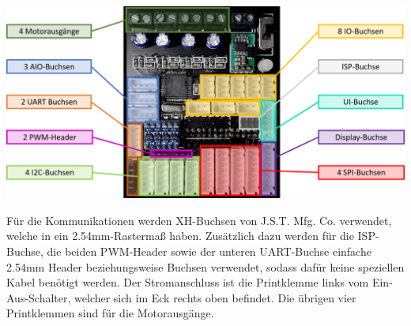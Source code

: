 \documentclass[12pt]{article}
\begin{document}
\begin{center}\end{center}
\includegraphics[width=\textwidth]{img/connectors.png}
\begin{center}\end{center}
Für die Kommunikationen werden XH-Buchsen von J.S.T. Mfg. Co. verwendet, welche in ein 2.54mm-Rastermaß haben. Zusätzlich dazu werden für die ISP-Buchse, die beiden PWM-Header sowie der unteren UART-Buchse einfache 2.54mm Header beziehungsweise Buchsen verwendet, sodass dafür keine speziellen Kabel benötigt werden. Der Stromanschluss ist die Printklemme links vom Ein-Aus-Schalter, welcher sich im Eck rechts oben befindet. Die übrigen vier Printklemmen sind für die Motorausgänge.
\end{document}
